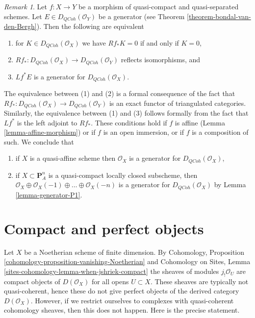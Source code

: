 \documentclass{stacks-project}
\theoremstyle{plain}
\theoremstyle{definition}
\theoremstyle{remark}
\newtheorem{remark}[subsection]{Remark}
\numberwithin{equation}{subsection}
\def\QCoh{\mathit{QCoh}}
\begin{document}
\begin{remark}
\label{remark-pullback-generator}
Let $f : X \to Y$ be a morphism of quasi-compact and quasi-separated schemes.
Let $E \in D_\QCoh(\mathcal{O}_Y)$ be a generator
(see Theorem \ref{theorem-bondal-van-den-Bergh}).
Then the following are equivalent
\begin{enumerate}
\item for $K \in D_\QCoh(\mathcal{O}_X)$ we have
$Rf_*K = 0$ if and only if $K = 0$,
\item $Rf_* : D_\QCoh(\mathcal{O}_X) \to D_\QCoh(\mathcal{O}_Y)$
reflects isomorphisms, and
\item $Lf^*E$ is a generator for $D_\QCoh(\mathcal{O}_X)$.
\end{enumerate}
The equivalence between (1) and (2) is a formal consequence of the fact that
$Rf_* : D_\QCoh(\mathcal{O}_X) \to D_\QCoh(\mathcal{O}_Y)$ is an
exact functor of triangulated categories. Similarly, the equivalence
between (1) and (3) follows formally from the fact that $Lf^*$
is the left adjoint to $Rf_*$.
These conditions hold if $f$ is affine (Lemma \ref{lemma-affine-morphism})
or if $f$ is an open immersion, or if $f$ is a composition of such.
We conclude that
\begin{enumerate}
\item if $X$ is a quasi-affine scheme then $\mathcal{O}_X$ is a generator
for $D_\QCoh(\mathcal{O}_X)$,
\item if $X \subset \mathbf{P}^n_A$ is a quasi-compact
locally closed subscheme, then
$\mathcal{O}_X \oplus \mathcal{O}_X(-1) \oplus \ldots \oplus \mathcal{O}_X(-n)$
is a generator for $D_\QCoh(\mathcal{O}_X)$ by
Lemma \ref{lemma-generator-P1}.
\end{enumerate}
\end{remark}




\section{Compact and perfect objects}
\label{section-compact}

\noindent
Let $X$ be a Noetherian scheme of finite dimension. By
Cohomology, Proposition \ref{cohomology-proposition-vanishing-Noetherian}
and
Cohomology on Sites, Lemma \ref{sites-cohomology-lemma-when-jshriek-compact}
the sheaves of modules $j_!\mathcal{O}_U$ are compact objects
of $D(\mathcal{O}_X)$ for all opens $U \subset X$.
These sheaves are typically not quasi-coherent, hence these
do not give perfect objects of the derived category $D(\mathcal{O}_X)$.
However, if we restrict ourselves to complexes with quasi-coherent
cohomology sheaves, then this does not happen.
Here is the precise statement.
\end{document}
